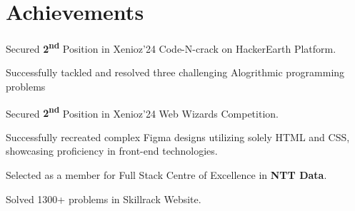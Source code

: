 \documentclass[14pt]{deedy-resume-openfont}
\begin{document}
\begin{minipage}[t]{0.66\textwidth}
    \section{Achievements}


    \begin{tightemize}
        \item Secured \textbf{2\textsuperscript{nd}} Position in Xenioz'24 Code-N-crack on HackerEarth Platform.
        \item Successfully tackled and resolved three challenging Alogrithmic programming problems
    \end{tightemize}
    \sectionsep

    \begin{tightemize}
        \item Secured \textbf{2\textsuperscript{nd}}  Position in Xenioz'24 Web Wizards Competition.
        \item Successfully recreated complex Figma designs utilizing solely HTML and CSS, showcasing proficiency in front-end technologies.
    \end{tightemize}
    \sectionsep


    \begin{tightemize}
        \item Selected as a member for Full Stack Centre of Excellence in {\bf NTT Data}.
    \end{tightemize}
    \sectionsep


    \begin{tightemize}
        \item Solved 1300+ problems in Skillrack Website.
    \end{tightemize}
    \sectionsep






\end{minipage}
\end{document}
